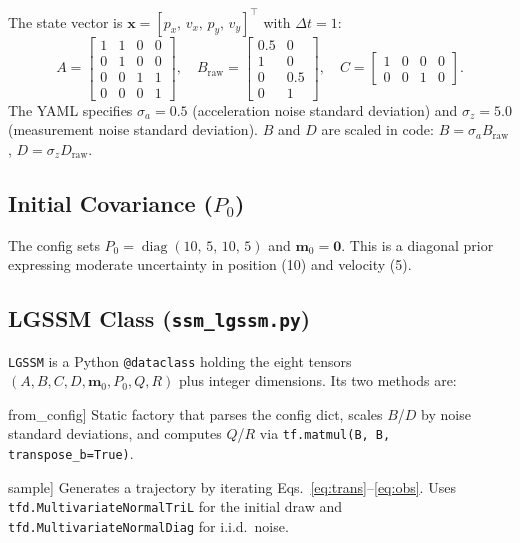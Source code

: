 \documentclass[11pt,a4paper]{article}
\newcommand{\py}[1]{\lstinline[style=py]{#1}}
\newcommand{\file}[1]{\texttt{#1}}
\begin{document}
The state vector is $\bm{x} = [p_x,\, v_x,\, p_y,\, v_y]^\top$
with $\Delta t = 1$:
\[
A = \begin{bmatrix}1&1&0&0\\0&1&0&0\\0&0&1&1\\0&0&0&1\end{bmatrix},
\quad
B_{\text{raw}} = \begin{bmatrix}0.5&0\\1&0\\0&0.5\\0&1\end{bmatrix},
\quad
C = \begin{bmatrix}1&0&0&0\\0&0&1&0\end{bmatrix}.
\]
The YAML specifies $\sigma_a=0.5$ (acceleration noise standard
deviation) and $\sigma_z=5.0$ (measurement noise standard deviation).
$B$ and $D$ are scaled in code:
$B = \sigma_a B_{\text{raw}}$, $D = \sigma_z D_{\text{raw}}$.

\subsection{Initial Covariance ($P_0$)}

The config sets
$P_0 = \operatorname{diag}(10,\,5,\,10,\,5)$
and $\bm{m}_0 = \bm{0}$.  This is a diagonal prior expressing
moderate uncertainty in position (10) and velocity (5).

\subsection{LGSSM Class (\file{ssm\_lgssm.py})}

\py{LGSSM} is a Python \py{@dataclass} holding the eight tensors
$(A,B,C,D,\bm{m}_0,P_0,Q,R)$ plus integer dimensions.
Its two methods are:

\begin{description}[leftmargin=1.5cm]
\item[\py{from_config}] Static factory that parses the config dict,
  scales $B$/$D$ by noise standard deviations, and computes $Q$/$R$ via
  \py{tf.matmul(B, B, transpose_b=True)}.
\item[\py{sample}] Generates a trajectory by iterating
  Eqs.~\eqref{eq:trans}--\eqref{eq:obs}.  Uses
  \py{tfd.MultivariateNormalTriL} for the initial draw and
  \py{tfd.MultivariateNormalDiag} for i.i.d.\ noise.
\end{description}
\end{document}
